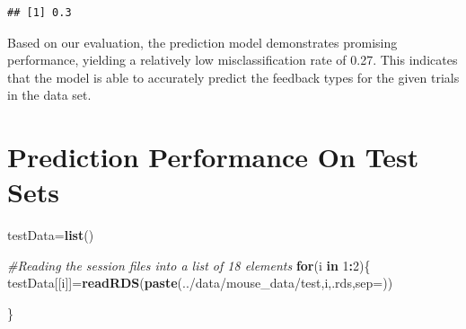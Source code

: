 \documentclass[
]{article}
\newenvironment{Shaded}{\begin{snugshade}}{\end{snugshade}}
\newcommand{\AttributeTok}[1]{\textcolor[rgb]{0.13,0.29,0.53}{#1}}
\newcommand{\CommentTok}[1]{\textcolor[rgb]{0.56,0.35,0.01}{\textit{#1}}}
\newcommand{\ControlFlowTok}[1]{\textcolor[rgb]{0.13,0.29,0.53}{\textbf{#1}}}
\newcommand{\DecValTok}[1]{\textcolor[rgb]{0.00,0.00,0.81}{#1}}
\newcommand{\FunctionTok}[1]{\textcolor[rgb]{0.13,0.29,0.53}{\textbf{#1}}}
\newcommand{\NormalTok}[1]{#1}
\newcommand{\OtherTok}[1]{\textcolor[rgb]{0.56,0.35,0.01}{#1}}
\newcommand{\SpecialCharTok}[1]{\textcolor[rgb]{0.81,0.36,0.00}{\textbf{#1}}}
\newcommand{\StringTok}[1]{\textcolor[rgb]{0.31,0.60,0.02}{#1}}
\begin{document}
\begin{verbatim}
## [1] 0.3
\end{verbatim}

Based on our evaluation, the prediction model demonstrates promising
performance, yielding a relatively low misclassification rate of 0.27.
This indicates that the model is able to accurately predict the feedback
types for the given trials in the data set.

\section{Prediction Performance On Test
Sets}\label{prediction-performance-on-test-sets}

\begin{Shaded}
\begin{Highlighting}[]
\NormalTok{testData}\OtherTok{=}\FunctionTok{list}\NormalTok{()}

\CommentTok{\#Reading the session files into a list of 18 elements}
\ControlFlowTok{for}\NormalTok{(i }\ControlFlowTok{in} \DecValTok{1}\SpecialCharTok{:}\DecValTok{2}\NormalTok{)\{}
\NormalTok{  testData[[i]]}\OtherTok{=}\FunctionTok{readRDS}\NormalTok{(}\FunctionTok{paste}\NormalTok{(}\StringTok{\textquotesingle{}../data/mouse\_data/test\textquotesingle{}}\NormalTok{,i,}\StringTok{\textquotesingle{}.rds\textquotesingle{}}\NormalTok{,}\AttributeTok{sep=}\StringTok{\textquotesingle{}\textquotesingle{}}\NormalTok{))}

  
\NormalTok{\}}
\end{Highlighting}
\end{Shaded}
\end{document}
